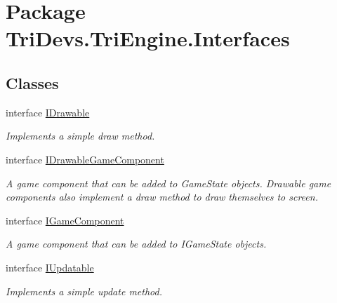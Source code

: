 \hypertarget{namespace_tri_devs_1_1_tri_engine_1_1_interfaces}{\section{Package Tri\-Devs.\-Tri\-Engine.\-Interfaces}
\label{namespace_tri_devs_1_1_tri_engine_1_1_interfaces}
}
\subsection*{Classes}
\begin{DoxyCompactItemize}
\item 
interface \hyperlink{interface_tri_devs_1_1_tri_engine_1_1_interfaces_1_1_i_drawable}{I\-Drawable}
\begin{DoxyCompactList}\small\item\em Implements a simple draw method. \end{DoxyCompactList}\item 
interface \hyperlink{interface_tri_devs_1_1_tri_engine_1_1_interfaces_1_1_i_drawable_game_component}{I\-Drawable\-Game\-Component}
\begin{DoxyCompactList}\small\item\em A game component that can be added to Game\-State objects. Drawable game components also implement a draw method to draw themselves to screen. \end{DoxyCompactList}\item 
interface \hyperlink{interface_tri_devs_1_1_tri_engine_1_1_interfaces_1_1_i_game_component}{I\-Game\-Component}
\begin{DoxyCompactList}\small\item\em A game component that can be added to I\-Game\-State objects. \end{DoxyCompactList}\item 
interface \hyperlink{interface_tri_devs_1_1_tri_engine_1_1_interfaces_1_1_i_updatable}{I\-Updatable}
\begin{DoxyCompactList}\small\item\em Implements a simple update method. \end{DoxyCompactList}\end{DoxyCompactItemize}
